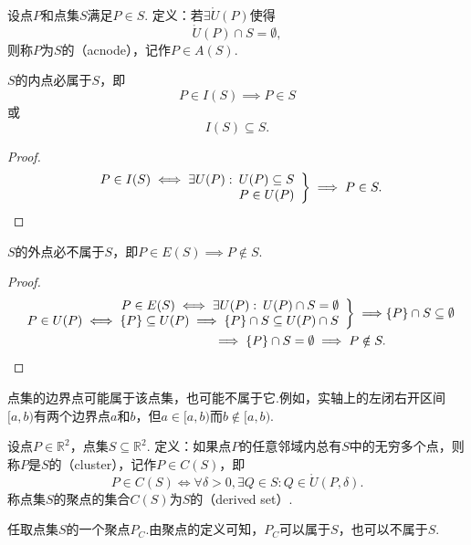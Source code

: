 \begin{definition}
设点\(P\)和点集\(S\)满足\(P \in S\).
定义：若\(\exists \mathring{U}(P)\)使得\[
\mathring{U}(P) \cap S = \emptyset,
\]则称\(P\)为\(S\)的（acnode），记作\(P \in A(S)\).
\end{definition}

\begin{property}
\(S\)的内点必属于\(S\)，即\[
P \in I(S) \implies P \in S
\]或\[
I(S) \subseteq S.
\]
\begin{proof}
\[
\left. \begin{array}{r}
P \in I(S) \iff \exists U(P) :\: U(P) \subseteq S \\
P \in U(P)
\end{array} \right\}
\implies P \in S.
\qedhere
\]
\end{proof}
\end{property}

\begin{property}
\(S\)的外点必不属于\(S\)，即\(P \in E(S) \implies P \notin S\).
\begin{proof}
\begin{align*}
\left. \begin{array}{r}
P \in E(S) \iff \exists U(P) :\: U(P) \cap S = \emptyset \\
P \in U(P) \iff \{P\} \subseteq U(P) \implies \{P\} \cap S \subseteq U(P) \cap S
\end{array} \right\}
\implies& \{P\} \cap S \subseteq \emptyset \\
\implies \{P\} \cap S = \emptyset
\implies P \notin S.&
\qedhere
\end{align*}
\end{proof}
\end{property}

\begin{example}
点集的边界点可能属于该点集，也可能不属于它.例如，实轴上的左闭右开区间\([a,b)\)有两个边界点\(a\)和\(b\)，但\(a \in [a,b)\)而\(b \notin [a,b)\).
\end{example}

\begin{definition}
设点\(P\in\mathbb{R}^2\)，点集\(S\subseteq\mathbb{R}^2\).
定义：如果点\(P\)的任意邻域内总有\(S\)中的无穷多个点，则称\(P\)是\(S\)的（cluster），记作\(P \in C(S)\)，即\[
P \in C(S)
\iff
\forall\delta>0,\exists Q \in S : Q \in \mathring{U}(P,\delta).
\]称点集\(S\)的聚点的集合\(C(S)\)为\(S\)的（derived set）.
\end{definition}
任取点集\(S\)的一个聚点\(P_C\).由聚点的定义可知，\(P_C\)可以属于\(S\)，也可以不属于\(S\).

